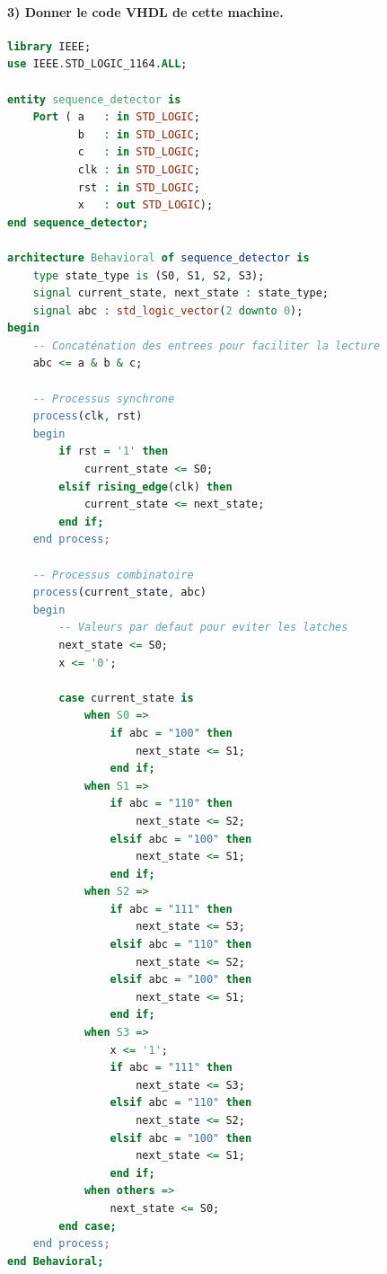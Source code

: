 \documentclass[11pt,a4paper]{article}
\begin{document}
\paragraph{3) Donner le code VHDL de cette machine.}

\begin{lstlisting}[language=VHDL]
library IEEE;
use IEEE.STD_LOGIC_1164.ALL;

entity sequence_detector is
    Port ( a   : in STD_LOGIC;
           b   : in STD_LOGIC;
           c   : in STD_LOGIC;
           clk : in STD_LOGIC;
           rst : in STD_LOGIC;
           x   : out STD_LOGIC);
end sequence_detector;

architecture Behavioral of sequence_detector is
    type state_type is (S0, S1, S2, S3);
    signal current_state, next_state : state_type;
    signal abc : std_logic_vector(2 downto 0);
begin
    -- Concaténation des entrees pour faciliter la lecture
    abc <= a & b & c;

    -- Processus synchrone
    process(clk, rst)
    begin
        if rst = '1' then
            current_state <= S0;
        elsif rising_edge(clk) then
            current_state <= next_state;
        end if;
    end process;

    -- Processus combinatoire
    process(current_state, abc)
    begin
        -- Valeurs par defaut pour eviter les latches
        next_state <= S0;
        x <= '0';

        case current_state is
            when S0 =>
                if abc = "100" then
                    next_state <= S1;
                end if;
            when S1 =>
                if abc = "110" then
                    next_state <= S2;
                elsif abc = "100" then
                    next_state <= S1;
                end if;
            when S2 =>
                if abc = "111" then
                    next_state <= S3;
                elsif abc = "110" then
                    next_state <= S2;
                elsif abc = "100" then
                    next_state <= S1;
                end if;
            when S3 =>
                x <= '1';
                if abc = "111" then
                    next_state <= S3;
                elsif abc = "110" then
                    next_state <= S2;
                elsif abc = "100" then
                    next_state <= S1;
                end if;
            when others =>
                next_state <= S0;
        end case;
    end process;
end Behavioral;
\end{lstlisting}
\end{document}
